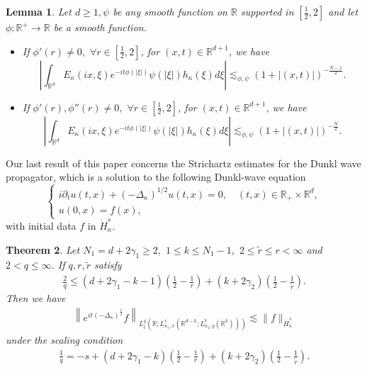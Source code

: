 \documentclass[a4paper,11pt, reqno]{amsart}
\newtheorem{theorem}{Theorem}[section]
\newtheorem{lem}[theorem]{Lemma}
\theoremstyle{definition}
\theoremstyle{remark}
\numberwithin{equation}{section}
\begin{document}
    \begin{lem}\label{fractionalinr}
			Let  $d \geq 1,  \psi$ be any smooth function on $\mathbb{R}$ supported in $[\frac{1}{2},2]$ and let $\phi: \mathbb{R}^+ \to \mathbb{R}$ be a smooth function.
			\begin{itemize}
				\item If $\phi'(r)\neq0,$ $\forall r\in [\frac{1}{2},2]$, for $(x, t) \in \mathbb{R}^{d+1}$, we have
				$$
				\left|\int_{\mathbb{R}^{d}} E_{\kappa}(ix, \xi) e^{-i t\phi(|\xi|)} \psi(|\xi|) h_\kappa(\xi)  d \xi\right| \lesssim_{\phi,\psi}
				(1+|(x, t)|)^{-\frac{N-1}{2}}.
				$$
				\item If $\phi'(r),\phi''(r)\neq0,$ $\forall r\in [\frac{1}{2},2]$, for $(x, t) \in \mathbb{R}^{d+1}$, we have
				$$
				\left|\int_{\mathbb{R}^{d}} E_{\kappa}(ix, \xi) e^{-i t\phi(|\xi|)} \psi(|\xi|) h_\kappa(\xi)  d \xi\right| \lesssim_{\phi,\psi}
				(1+|(x, t)|)^{-\frac{N}{2}}.
				$$
			\end{itemize}
	\end{lem}

    Our last result of this paper concerns the Strichartz estimates for the Dunkl wave propagator, which is a solution to the following Dunkl-wave equation
    \begin{equation*}
		\begin{cases}
			i\partial_t u(t, x) + (-\Delta_\kappa)^{1/2} u(t, x)= 0, \quad (t, x) \in \mathbb{R}_+ \times \mathbb{R}^d, \\
			u(0, x)=f(x),
		\end{cases}
	\end{equation*}
    with  initial data $f$ in $\dot{H}_{\kappa}^s$.

    \begin{theorem}\label{Dunklwaveintro}
		Let $N_1=d+2\gamma_1 \geq 2,$ $1 \leq k \leq N_1-1,$ $ 2 \leq \widetilde{r} \leq r<\infty $ and $ 2<q \leq \infty$. If $ q, r, \tilde{r}$ satisfy 
		\begin{align*}
			\frac{2}{q} \leq(d+2\gamma_1-k-1)\left(\frac{1}{2}-\frac{1}{r}\right)+(k+2\gamma_2)\left(\frac{1}{2}-\frac{1}{\widetilde{r}}\right). 
		\end{align*}
		Then we have
		\begin{align*}
			\left\|e^{i t(-\Delta_\kappa)^{\frac{1}{2}}} f\right\|_{L_t^q\left(\mathbb{R} ; L_{{\kappa_1},x}^r\left(\mathbb{R}^{d-k} ; L_{{ \kappa_2},y}^{\tilde{r}}\left(\mathbb{R}^k\right)\right)\right)} \lesssim\|f\|_{\dot{H}_{\kappa}^s}
		\end{align*}
		under the scaling condition
		\begin{align*}
			\frac{{{1}}}{q}=-s +(d+2\gamma_1-k)\left(\frac{1}{2}-\frac{1}{r}\right)+(k+2\gamma_2)\left(\frac{1}{2}-\frac{1}{\widetilde{r}}\right).
		\end{align*}
	\end{theorem}   
\end{document}
